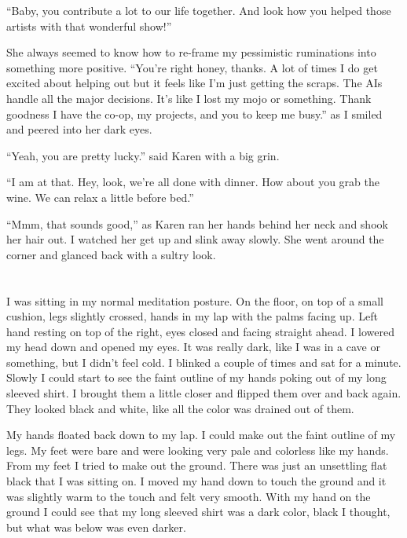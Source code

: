 ``Baby, you contribute a lot to our life together. And look how
you helped those artists with that wonderful show!''

She always seemed to know how to re-frame my pessimistic
ruminations into something more positive.  ``You're right honey,
thanks. A lot of times I do get excited about helping out but it
feels like I'm just getting the scraps.  The AIs handle all the
major decisions. It's like I lost my mojo or something. Thank
goodness I have the co-op, my projects, and you to keep me
busy.'' as I smiled and peered into her dark eyes.

``Yeah, you are pretty lucky.'' said Karen with a big grin.

``I am at that. Hey, look, we're all done with dinner.
How about you grab the wine. We can relax a little before
bed.''

``Mmm, that sounds good,'' as Karen ran her hands behind her
neck and shook her hair out.  I watched her get up and slink
away slowly. She went around the corner and glanced back with a
sultry look.
\section{}


I was sitting in my normal meditation posture. On the floor, on
top of a small cushion, legs slightly crossed, hands in my lap
with the palms facing up. Left hand resting on top of the right,
eyes closed and facing straight ahead.  I lowered my head down
and opened my eyes.  It was really dark, like I was in a cave or
something, but I didn't feel cold. I blinked a couple of times
and sat for a minute. Slowly I could start to see the faint
outline of my hands poking out of my long sleeved shirt. I
brought them a little closer and flipped them over and back
again. They looked black and white, like all the color was
drained out of them.

My hands floated back down to my lap. I could make out the faint
outline of my legs. My feet were bare and were looking very pale
and colorless like my hands. From my feet I tried to make out
the ground. There was just an unsettling flat black that I was
sitting on. I moved my hand down to touch the ground and it was
slightly warm to the touch and felt very smooth. With my hand on
the ground I could see that my long sleeved shirt was a dark
color, black I thought, but what was below was even darker.

